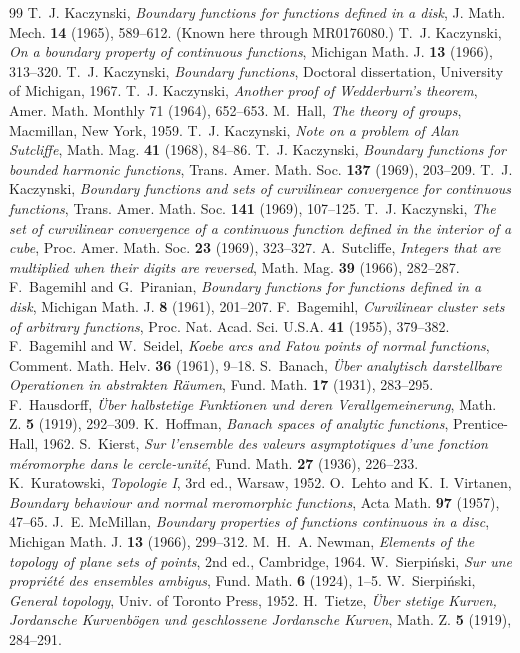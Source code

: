 \documentclass[11pt,reqno]{amsart}
\theoremstyle{definition}
\theoremstyle{remark}
\numberwithin{equation}{section}
\begin{document}
\begin{thebibliography}{99}
 T.~J. Kaczynski, \emph{Boundary functions for functions defined in a disk},
  J. Math. Mech. \textbf{14} (1965), 589--612. (Known here through MR0176080.)
 T.~J. Kaczynski, \emph{On a boundary property of continuous functions},
  Michigan Math. J. \textbf{13} (1966), 313--320.
 T.~J. Kaczynski, \emph{Boundary functions}, Doctoral dissertation, University of
  Michigan, 1967.
 T.~J. Kaczynski, \emph{Another proof of Wedderburn's theorem}, Amer. Math. Monthly 71 (1964),
  652--653.
 M.~Hall, \emph{The theory of groups}, Macmillan, New York, 1959.
 T.~J. Kaczynski, \emph{Note on a problem of Alan Sutcliffe}, Math. Mag.
  \textbf{41} (1968), 84--86.
 T.~J. Kaczynski, \emph{Boundary functions for bounded harmonic functions},
  Trans. Amer. Math. Soc. \textbf{137} (1969), 203--209.
 T.~J. Kaczynski, \emph{Boundary functions and sets of curvilinear convergence for
  continuous functions}, Trans. Amer. Math. Soc. \textbf{141} (1969), 107--125.
 T.~J. Kaczynski, \emph{The set of curvilinear convergence of a continuous function
  defined in the interior of a cube}, Proc. Amer. Math. Soc. \textbf{23} (1969), 323--327.
 A.~Sutcliffe, \emph{Integers that are multiplied when their digits are reversed},
  Math. Mag. \textbf{39} (1966), 282--287.
 F.~Bagemihl and G.~Piranian, \emph{Boundary functions for functions defined in a disk},
  Michigan Math. J. \textbf{8} (1961), 201--207.
 F.~Bagemihl, \emph{Curvilinear cluster sets of arbitrary functions}, Proc. Nat. Acad.
  Sci. U.S.A. \textbf{41} (1955), 379--382.
 F.~Bagemihl and W.~Seidel, \emph{Koebe arcs and Fatou points of normal functions},
  Comment. Math. Helv. \textbf{36} (1961), 9--18.
 S.~Banach, \emph{\"Uber analytisch darstellbare Operationen in abstrakten
  R\"aumen}, Fund. Math. \textbf{17} (1931), 283--295.
 F.~Hausdorff, \emph{\"Uber halbstetige Funktionen und deren
  Verallgemeinerung}, Math. Z. \textbf{5} (1919), 292--309.
 K.~Hoffman, \emph{Banach spaces of analytic functions}, Prentice-Hall, 1962.
 S.~Kierst, \emph{Sur l'ensemble des valeurs asymptotiques d'une fonction
  m\'eromorphe dans le cercle-unit\'e}, Fund. Math. \textbf{27} (1936), 226--233.
 K.~Kuratowski, \emph{Topologie I}, 3rd ed., Warsaw, 1952.
 O.~Lehto and K.~I. Virtanen, \emph{Boundary behaviour and normal meromorphic
  functions}, Acta Math. \textbf{97} (1957), 47--65.
 J.~E. McMillan, \emph{Boundary properties of functions continuous in a disc},
  Michigan Math. J. \textbf{13} (1966), 299--312.
 M.~H.~A. Newman, \emph{Elements of the topology of plane sets of points}, 2nd ed.,
  Cambridge, 1964.
 W.~Sierpi\'nski, \emph{Sur une propri\'et\'e des ensembles ambigus}, Fund.
  Math. \textbf{6} (1924), 1--5.
 W.~Sierpi\'nski, \emph{General topology}, Univ. of Toronto Press, 1952.
 H.~Tietze, \emph{\"Uber stetige Kurven, Jordansche Kurvenb\"ogen und geschlossene
  Jordansche Kurven}, Math. Z. \textbf{5} (1919), 284--291.
\end{thebibliography}
\end{document}
